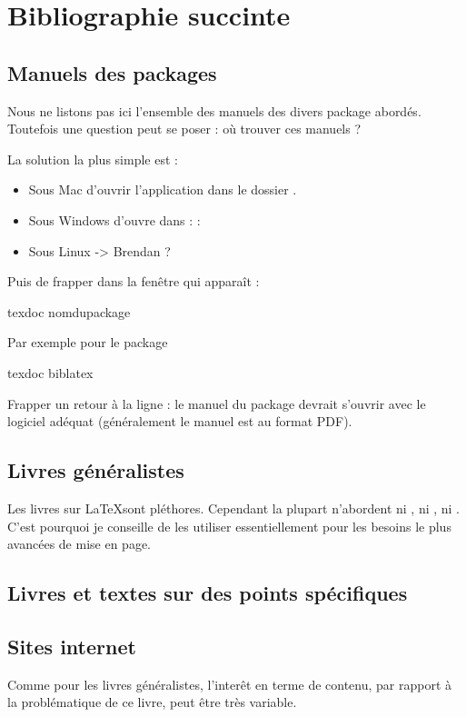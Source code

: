 \chapter{Bibliographie succinte}

\nocite{*}
\section{Manuels des packages}

Nous ne listons pas ici l'ensemble des manuels des divers package abordés. Toutefois une question peut se poser : où trouver ces manuels ?

La solution la plus simple est :
\begin{itemize}
\item Sous Mac d'ouvrir l'application  dans le dossier .
\item Sous Windows d'ouvre  dans  :  : 
\item Sous Linux -> Brendan ?
\end{itemize}

Puis de frapper dans la fenêtre qui apparaît :

\begin{bashcode}
texdoc nomdupackage
\end{bashcode}

Par exemple pour le package 

\begin{bashcode}
texdoc biblatex
\end{bashcode}

Frapper un retour à la ligne : le manuel du package devrait s'ouvrir avec le logiciel adéquat (généralement le manuel est au format PDF).

\section{Livres généralistes}

Les livres sur \LaTeX sont pléthores. Cependant la plupart n'abordent ni \XeLaTeX, ni , ni . C'est pourquoi je conseille de les utiliser essentiellement pour les besoins le plus avancées de mise en page.

\printbibliography[keyword=generaliste]

\section{Livres et textes sur des points spécifiques}

\printbibliography[keyword=specifique]


\section{Sites internet}

Comme pour les livres généralistes,  l'interêt en terme de contenu, par rapport à la problématique de ce livre, peut être très variable. 

\printbibliography[keyword=site]
